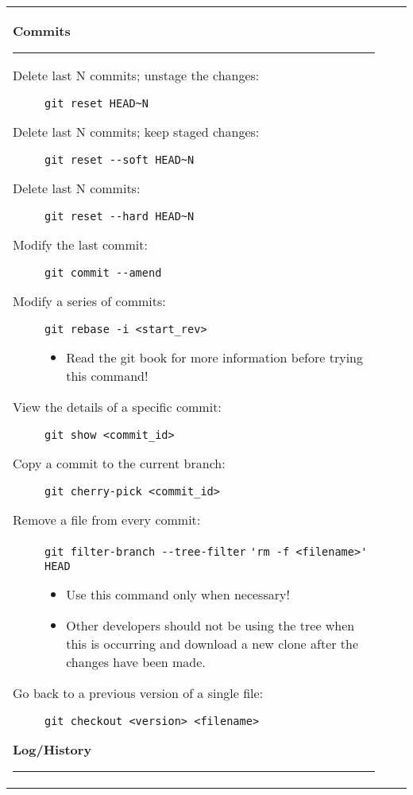 \documentclass[landscape]{article}
\begin{document}
\begin{tabular*}{10.5in}{|p{2.9in}|p{2.9in}|p{2.9in}|}
    \begin{flushleft}
        \textbf{\large{Commits}}
        \rule{2.9in}{.5pt}
        \small
        \begin{description}
            \item[Delete last N commits; unstage the changes:]
                {\verb!git reset HEAD~N!}
            \item[Delete last N commits; keep staged changes:]
                {\verb!git reset --soft HEAD~N!}
            \item[Delete last N commits:]
                {\verb!git reset --hard HEAD~N!}
            \item[Modify the last commit:]
                {\verb!git commit --amend!}
            \item[Modify a series of commits:]
                {\verb!git rebase -i <start_rev>!}
                \begin{itemize}
                    \item{Read the git book for more information before trying
                        this command!}
                \end{itemize}
            \item[View the details of a specific commit:]
                {\verb!git show <commit_id>!}
            \item[Copy a commit to the current branch:]
                {\verb!git cherry-pick <commit_id>!}
            \item[Remove a file from every commit:]
                {\verb!git filter-branch --tree-filter!
                 \verb!'rm -f <filename>' HEAD!}
                \begin{itemize}
                    \item{Use this command only when necessary!}
                    \item{Other developers should not be using the tree when
                        this is occurring and download a new clone after the
                        changes have been made.}
                \end{itemize}
            \item[Go back to a previous version of a single file:]
                {\verb!git checkout <version> <filename>!}
        \end{description}
        \textbf{\large{Log/History}}
        \rule{2.9in}{.5pt}
        \small
        \begin{description}

\end{description}
\end{flushleft}
\end{tabular*}
\end{document}
